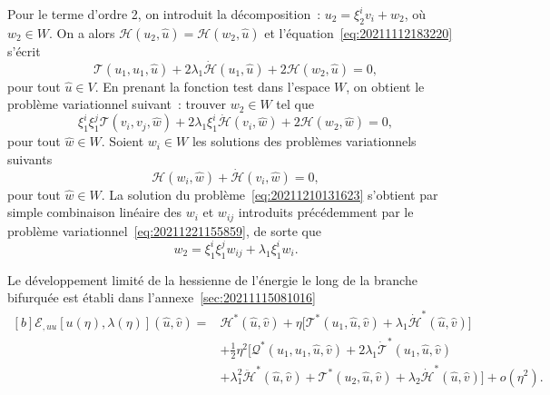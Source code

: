 \documentclass[12pt, final]{amsart}
\begin{document}
Pour le terme d'ordre 2, on introduit la décomposition~:
\(u_2=ξ_2^iv_i+w_2\), où \(w_2\in W\). On a alors
\(\mathcal H(u_2, \hat{u})=\mathcal H(w_2, \hat{u})\) et
l'équation~\eqref{eq:20211112183220} s'écrit
\begin{equation}
  \mathcal T(u_1, u_1, \hat{u})+2\lambda_1\dot{\mathcal H}(u_1, \hat{u})
  +2\mathcal H(w_2, \hat{u})=0,
\end{equation}
pour tout \(\hat{u}\in V\). En prenant la fonction test dans l'espace \(W\), on
obtient le problème variationnel suivant~: trouver \(w_2\in W\) tel
que
\begin{equation}
  \label{eq:20211210131623}
  ξ_1^iξ_1^j\mathcal T(v_i, v_j, \hat{w})
  +2\lambda_1ξ_1^i\dot{\mathcal H}(v_i, \hat{w})
  +2\mathcal H(w_2, \hat{w})=0,
\end{equation}
pour tout \(\hat{w}\in W\). Soient \(w_i\in W\) les solutions des problèmes
variationnels suivants
\begin{equation}
  \mathcal H(w_i, \hat{w})+\dot{\mathcal H}(v_i, \hat{w})=0,
\end{equation}
pour tout \(\hat{w}\in W\). La solution du problème~\eqref{eq:20211210131623}
s'obtient par simple combinaison linéaire des \(w_i\) et \(w_{ij}\) introduits
précédemment par le problème variationnel~\eqref{eq:20211221155859}, de sorte
que
\begin{equation}
  w_2=ξ_1^iξ_1^jw_{ij}+\lambda_1ξ_1^i w_i.
\end{equation}

Le développement limité de la hessienne de l'énergie le long de la
branche bifurquée est établi dans l'annexe~\ref{sec:20211115081016}
\begin{equation}
  \label{eq:20211115082025}
  \begin{aligned}[b]
    \mathcal E_{,uu}[u(\eta), \lambda(\eta)](\hat{u}, \hat{v})
    ={}&\mathcal H^\ast(\hat{u}, \hat{v})
    +\eta\bigl[\mathcal T^\ast(u_1, \hat{u}, \hat{v})
    +\lambda_1\dot{\mathcal H}^\ast(\hat{u}, \hat{v})\bigr]\\
    &+\tfrac12\eta^2\bigl[\mathcal Q^\ast(u_1, u_1, \hat{u}, \hat{v})
    +2\lambda_1\dot{\mathcal T}^\ast(u_1, \hat{u}, \hat{v})\\
    &+\lambda_1^2\ddot{\mathcal H}^\ast(\hat{u}, \hat{v})
    +\mathcal T^\ast(u_2, \hat{u}, \hat{v})
    +\lambda_2\dot{\mathcal H}^\ast(\hat{u}, \hat{v})\bigr]+o(\eta^2).
  \end{aligned}
\end{equation}
\end{document}
